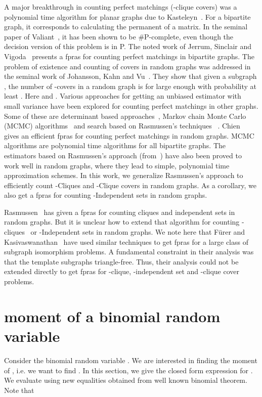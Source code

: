\documentclass[runningheads,a4paper]{llncs}
\begin{document}
A major breakthrough in counting perfect matchings (-clique covers) was a polynomial time algorithm for planar graphs due to Kasteleyn~\cite{K61}.   For a bipartite graph, it corresponds to calculating the permanent of a  matrix. In the seminal  paper of Valiant~\cite{V79}, 
 it has been shown to be \#P-complete, even though the decision version of this problem is in P.
The noted work of Jerrum, Sinclair and Vigoda~\cite{JSV01} presents a fpras for counting perfect matchings in bipartite graphs. The problem of existence and counting of covers in random graphs  was addressed in the seminal work of Johansson, Kahn and Vu~\cite{JKV08}. 
They show that given a subgraph , the number of -covers in a random graph  is  for large enough  with probability at least . 
Here  and .  Various approaches for getting an unbiased estimator with small variance have been explored for counting perfect matchings in other graphs. 
Some of these are determinant based approaches~\cite{GG81,KKLLL93,C04,LP86}, Markov chain Monte Carlo (MCMC) algorithms~\cite{B86,JS89,JSV01,BSVV08} and search based on Rasmussen's techniques ~\cite{R94,R97,FK05,FK08}. 
Chien~\cite{C04}  gives an efficient fpras for counting perfect matchings in random graphs. MCMC algorithms are polynomial time algorithms for all bipartite graphs. 
The estimators based on Rasmussen's approach (from~\cite{R94}) have also been proved to work well in random graphs, where they lead to simple, polynomial time approximation schemes. In this work, we generalize Rasmussen's approach to efficiently count -Cliques and -Clique covers in random graphs. 
As a corollary, we also get a fpras for counting -Independent sets in random graphs.


 Rasmussen~\cite{R97} has given a fpras for counting cliques and independent sets in random graphs. But it is unclear how to extend that algorithm for counting -cliques~\cite{FM97} or -Independent sets in random graphs. We note here that 
F{\"u}rer and Kasivaswanathan~\cite{FK08} have used similar techniques to get fpras for a large class of subgraph isomorphism problems. A fundamental constraint in their analysis was that the template subgraphs triangle-free. Thus,
their analysis could not be extended directly to get fpras for -clique, -independent set and -clique cover problems. 


\section{  moment of a binomial random variable}\label{sec:app-model-definitions}
Consider the binomial random variable . We are interested in finding the  moment of , i.e. we want to find . In this section, we give the closed form expression for . 
We evaluate using new equalities obtained from well known binomial theorem. Note that 
\end{document}
